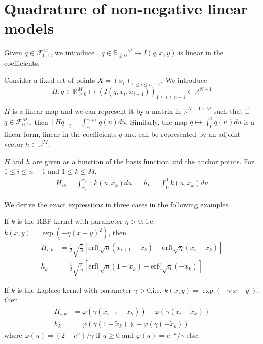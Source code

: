 \section{Quadrature of non-negative linear models}\label{app:diffytw-quadrature}

Given $q\in\mathcal F_{0,1}^M$, we introduce . $q\in{\mathbb R_{\geq 0}}^M \mapsto I(q, x, y)$ is linear in the coefficients.

Consider a fixed set of points $X=(x_i)_{1\leq i\leq n-1}$. We introduce
\begin{equation}
H: q\in\mathbb R_{\geq 0}^M \mapsto (I(q, x_i, x_{i+1}))_{1\leq i\leq n-1}\in \mathbb R^{N-1}
\end{equation}

$H$ is a linear map and we can represent it by a matrix in $\mathbb R^{N-1 \times M}$ such that if $q\in \mathcal F_{0,1}^M$, then $[Hq]_{i} = \int_{x_i}^{x_{i+1}}q(u)du$. Similarly, the map $q \mapsto \int_0^1 q(u)du$ is a linear form, linear in the coefficients $q$ and can be represented by an adjoint vector $h\in\mathbb R^M$.

$H$ and $h$ are given as a function of the basis function and the anchor points. For $1 \leq i \leq n-1$ and $1\leq k\leq M$,
\begin{align}\label{eq:H}
    H_{ik}= \int_{x_i}^{x_{i+1}}k(u, \tilde x_k)du&& h_k = \int_0^1 k(u, \tilde x_k)du
\end{align}

We derive the exact expressions in three cases in the following examples.

\begin{example}\label{ex:H-rbf} If $k$ is the RBF kernel with parameter $\eta > 0$, i.e. $k(x, y) = \exp\left( - \eta (x - y)^2\right)$, then
\begin{align}
    H_{i,k} &= \frac{1}{2}\sqrt{\frac{\pi}{\eta}}\left[\mathrm{erf}(\sqrt{\eta}(x_{i+1}-\tilde x_k) - \mathrm{erf}(\sqrt{\eta}(x_i- \tilde x_k) \right]\\
    h_k &= \frac{1}{2}\sqrt{\frac{\pi}{\eta}}\left[\mathrm{erf}(\sqrt{\eta}(1-\tilde x_k) - \mathrm{erf}(\sqrt{\eta}(- \tilde x_k) \right]
\end{align}
\end{example}
\begin{example}\label{ex:H-laplace} If $k$ is the Laplace kernel with parameter $\gamma > 0$,i.e. $k(x, y) = \exp\left( - \gamma\vert x - y\vert\right)$, then
\begin{align}
    H_{i,k} &= \varphi(\gamma(x_{i+1} - \tilde x_k)) - \varphi(\gamma(x_i - \tilde x_k))\\
    h_{k} &= \varphi(\gamma(1- \tilde x_k)) - \varphi(\gamma(- \tilde x_k))
\end{align}
where $\varphi(u) = (2 - e^u)/\gamma$ if $u \geq 0$ and $\varphi(u) = e^{-u} / \gamma$ else.
\end{example}
